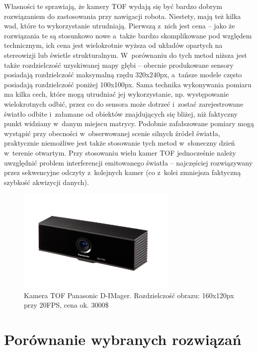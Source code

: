 Własności te sprawiają, że kamery TOF wydają się być bardzo dobrym rozwiązaniem
do zastosowania przy nawigacji robota. Niestety, mają też kilka wad, które to
wykorzystanie utrudniają. Pierwszą z~nich jest cena -- jako że rozwiązania te są
stosunkowo nowe a~także bardzo skomplikowane pod względem technicznym, ich cena
jest wielokrotnie wyższa od układów opartych na stereowizji lub świetle
strukturalnym. W~porównaniu do tych metod niższa jest także rozdzielczość
uzyskiwanej mapy głębi -- obecnie produkowane sensory posiadają rozdzielczość
maksymalną rzędu 320x240px, a~tańsze modele często posiadają rozdzielczość
poniżej 100x100px. Sama technika wykonywania pomiaru ma kilka cech, które mogą
utrudniać jej wykorzystanie, np. występowanie wielokrotnych odbić, przez co
do sensora może dotrzeć i~zostać zarejestrowane światło odbite i~załamane od
obiektów znajdujących się bliżej, niż faktyczny punkt widziany w~danym miejscu
matrycy. Podobnie zafałszowane pomiary mogą wystąpić przy obecności 
w~obserwowanej scenie silnych źródeł światła, praktycznie niemożliwe jest także
stosowanie tych metod w~słoneczny dzień w~terenie otwartym. Przy stosowaniu
wielu kamer TOF jednocześnie należy uwzględnić problem interferencji emitowanego
światła -- najczęściej rozwiązywany przez sekwencyjne odczyty z~kolejnych kamer
(co z~kolei zmniejsza faktyczną szybkość akwizycji danych).

\begin{figure}[h!]
\centering
\includegraphics[height=5cm]{../../Common/img/dimager}
\caption[Kamera TOF Panasonic D-IMager]{Kamera TOF Panasonic D-IMager.
Rozdzielczość obrazu: 160x120px przy 20FPS, cena ok. 3000\$}
\label{fig:dimager}
\end{figure}

\section{Porównanie wybranych rozwiązań}

